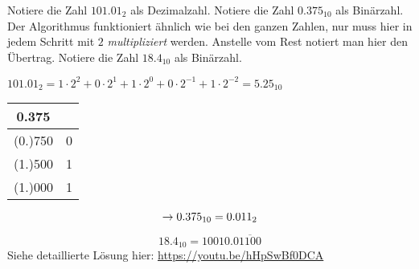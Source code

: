 \begin{question}
	\begin{tasks}
		\task Notiere die Zahl $101.01_2$ als Dezimalzahl.
		\task Notiere die Zahl $0.375_{10}$ als Binärzahl. Der Algorithmus funktioniert ähnlich wie bei den ganzen Zahlen, nur muss hier in jedem Schritt mit $2$ \textit{multipliziert} werden. Anstelle vom Rest notiert man hier den Übertrag.
		\task Notiere die Zahl $18.4_{10}$ als Binärzahl. 
	\end{tasks}	
\end{question}
\begin{solution}
	\begin{tasks}
		\task $101.01_2 = 
			  1 \cdot 2^{2}
			+ 0 \cdot 2^{1}
			+ 1 \cdot 2^{0}
			+ 0 \cdot 2^{-1}
			+ 1 \cdot 2^{-2}
			= 5.25_{10}
		$
		\task 
		\begin{table}[H]
			\centering
			\renewcommand{\arraystretch}{1.5}
			\begin{tabular}{|c|c|}
			\hline
			\textbf{0.375} & \\ \hline
			(0.)750 & 0 \\ \hline
			(1.)500 & 1 \\ \hline
			(1.)000 & 1 \\ \hline
			\end{tabular}
			$$\rightarrow 0.375_{10} = 0.011_2$$
		\end{table}
		\task
		$$18.4_{10} = 10010.0\overline{1100}$$
		Siehe detaillierte Lösung hier: \url{https://youtu.be/hHpSwBf0DCA}
	\end{tasks}	
\end{solution}

\newpage

